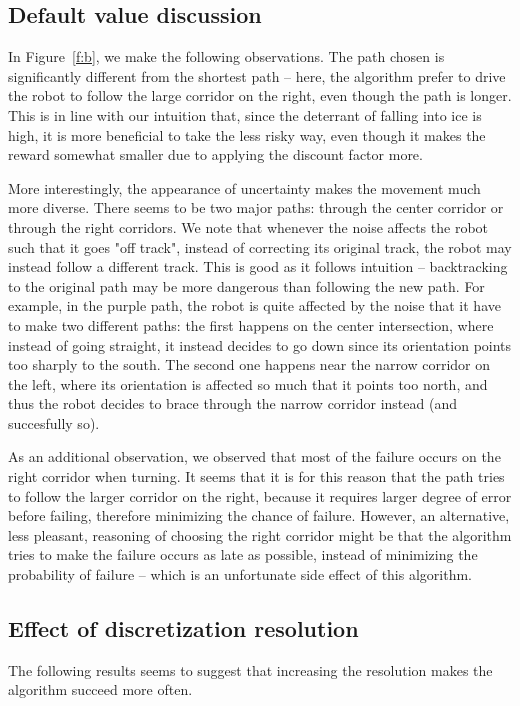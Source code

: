 \documentclass[a4paper]{article}
\begin{document}
\subsection{Default value discussion}
In Figure~\ref{f:b}, we make the following observations. The path chosen is
significantly different from the shortest path -- here, the algorithm prefer
to drive the robot to follow the large corridor on the right, even though
the path is longer. This is in line with our intuition that, since the deterrant
of falling into ice is high, it is more beneficial to take the less risky way,
even though it makes the reward somewhat smaller due to applying the discount
factor more.

More interestingly, the appearance of uncertainty makes the movement much more
diverse. There seems to be two major paths: through the center corridor or
through the right corridors. We note that whenever the noise affects the robot
such that it goes "off track", instead of correcting its original track, the
robot may instead follow a different track. This is good as it follows
intuition -- backtracking to the original path may be more dangerous
than following the new path. For example, in the purple path, the robot is
quite affected by the noise that it have to make two different paths: the first
happens on the center intersection, where instead of going straight, it instead
decides to go down since its orientation points too sharply to the south. The
second one happens near the narrow corridor on the left, where its orientation
is affected so much that it points too north, and thus the robot decides to
brace through the narrow corridor instead (and succesfully so).

As an additional observation, we observed that most of the failure occurs on the
right corridor when turning. It seems that it is for this reason that the path
tries to follow the larger corridor on the right, because it requires larger degree
of error before failing, therefore minimizing the chance of failure. However,
an alternative, less pleasant, reasoning of choosing the right corridor might
be that the algorithm tries to make the failure occurs as late as possible,
instead of minimizing the probability of failure -- which is an unfortunate side
effect of this algorithm.

\subsection{Effect of discretization resolution}
The following results seems to suggest that increasing the resolution makes the algorithm
succeed more often.
\end{document}
